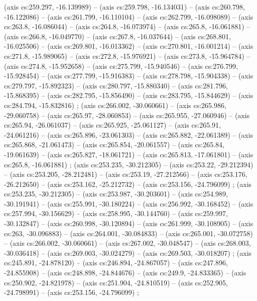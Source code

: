     (axis cs:259.297,    -16.139989) --  (axis cs:259.798,    -16.134031) --  (axis cs:260.798,    -16.122086) --  (axis cs:261.799,    -16.110104) --  (axis cs:262.799,    -16.098089) --  (axis cs:263.8,    -16.086044) --  (axis cs:264.8,    -16.073974) --  (axis cs:265.8,    -16.061881) --  (axis cs:266.8,    -16.049770) --  (axis cs:267.8,    -16.037644) --  (axis cs:268.801,    -16.025506) --  (axis cs:269.801,    -16.013362) --  (axis cs:270.801,    -16.001214) --  (axis cs:271.8,    -15.989065) --  (axis cs:272.8,    -15.976921) --  (axis cs:273.8,    -15.964784) --  (axis cs:274.8,    -15.952658) --  (axis cs:275.799,    -15.940546) --  (axis cs:276.799,    -15.928454) --  (axis cs:277.799,    -15.916383) --  (axis cs:278.798,    -15.904338) --  (axis cs:279.797,    -15.892323) --  (axis cs:280.797,    -15.880340) --  (axis cs:281.796,    -15.868395) --  (axis cs:282.795,    -15.856490) --  (axis cs:283.795,    -15.844629) --  (axis cs:284.794,    -15.832816) ;
    (axis cs:266.002,    -30.060661) --  (axis cs:265.986,    -29.060758) --  (axis cs:265.97,    -28.060853) --  (axis cs:265.955,    -27.060946) --  (axis cs:265.94,    -26.061037) --  (axis cs:265.925,    -25.061127) --  (axis cs:265.91,    -24.061216) --  (axis cs:265.896,    -23.061303) --  (axis cs:265.882,    -22.061389) --  (axis cs:265.868,    -21.061473) --  (axis cs:265.854,    -20.061557) --  (axis cs:265.84,    -19.061639) --  (axis cs:265.827,    -18.061721) --  (axis cs:265.813,    -17.061801) --  (axis cs:265.8,    -16.061881) ;
    (axis cs:253.235,    -30.212305) --  (axis cs:253.22,    -29.212394) --  (axis cs:253.205,    -28.212481) --  (axis cs:253.19,    -27.212566) --  (axis cs:253.176,    -26.212650) --  (axis cs:253.162,    -25.212732) --  (axis cs:253.156,    -24.796099) ;
    (axis cs:253.235,    -30.212305) --  (axis cs:253.987,    -30.203601) --  (axis cs:254.989,    -30.191941) --  (axis cs:255.991,    -30.180224) --  (axis cs:256.992,    -30.168452) --  (axis cs:257.994,    -30.156629) --  (axis cs:258.995,    -30.144760) --  (axis cs:259.997,    -30.132847) --  (axis cs:260.998,    -30.120894) --  (axis cs:261.999,    -30.108905) --  (axis cs:263,    -30.096883) --  (axis cs:264.001,    -30.084833) --  (axis cs:265.001,    -30.072758) --  (axis cs:266.002,    -30.060661) --  (axis cs:267.002,    -30.048547) --  (axis cs:268.003,    -30.036418) --  (axis cs:269.003,    -30.024279) --  (axis cs:269.503,    -30.018207) ;
    (axis cs:245.891,    -24.878120) --  (axis cs:246.894,    -24.867057) --  (axis cs:247.896,    -24.855908) --  (axis cs:248.898,    -24.844676) --  (axis cs:249.9,    -24.833365) --  (axis cs:250.902,    -24.821978) --  (axis cs:251.904,    -24.810519) --  (axis cs:252.905,    -24.798991) --  (axis cs:253.156,    -24.796099) ;
